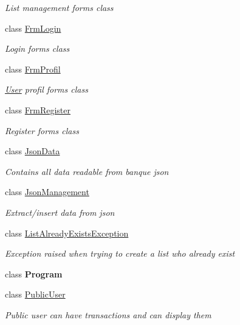 \begin{DoxyCompactItemize}
\begin{DoxyCompactList}\small\item\em List management form\textquotesingle{}s class \end{DoxyCompactList}\item 
class \mbox{\hyperlink{class_projet_banque_1_1_frm_login}{Frm\+Login}}
\begin{DoxyCompactList}\small\item\em Login form\textquotesingle{}s class \end{DoxyCompactList}\item 
class \mbox{\hyperlink{class_projet_banque_1_1_frm_profil}{Frm\+Profil}}
\begin{DoxyCompactList}\small\item\em \mbox{\hyperlink{class_projet_banque_1_1_user}{User}} profil form\textquotesingle{}s class \end{DoxyCompactList}\item 
class \mbox{\hyperlink{class_projet_banque_1_1_frm_register}{Frm\+Register}}
\begin{DoxyCompactList}\small\item\em Register form\textquotesingle{}s class \end{DoxyCompactList}\item 
class \mbox{\hyperlink{class_projet_banque_1_1_json_data}{Json\+Data}}
\begin{DoxyCompactList}\small\item\em Contains all data readable from banque json \end{DoxyCompactList}\item 
class \mbox{\hyperlink{class_projet_banque_1_1_json_management}{Json\+Management}}
\begin{DoxyCompactList}\small\item\em Extract/insert data from json \end{DoxyCompactList}\item 
class \mbox{\hyperlink{class_projet_banque_1_1_list_already_exists_exception}{List\+Already\+Exists\+Exception}}
\begin{DoxyCompactList}\small\item\em Exception raised when trying to create a list who already exist \end{DoxyCompactList}\item 
class {\bfseries Program}
\item 
class \mbox{\hyperlink{class_projet_banque_1_1_public_user}{Public\+User}}
\begin{DoxyCompactList}\small\item\em Public user can have transactions and can display them \end{DoxyCompactList}\item 

\end{DoxyCompactItemize}
